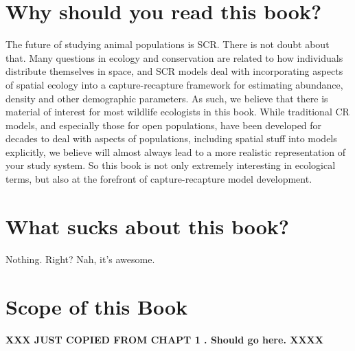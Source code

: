 \section*{Why should you read this book?}

The future of studying animal populations is SCR. There is not doubt
about that. Many questions in ecology and conservation are related to how individuals distribute themselves in space, and SCR models deal with incorporating aspects of spatial ecology into a capture-recapture framework for estimating abundance, density and other demographic parameters. As such, we believe that there is material of interest for most wildlife ecologists in this book. While traditional CR models, and especially those for open populations, have been developed for decades to deal with aspects of populations, including spatial stuff into models explicitly, we believe will almost always lead to a more realistic representation of your study system.  So this book is not only extremely interesting in ecological terms, but also at the forefront of capture-recapture model development.

\section{What sucks about this book?}

Nothing. Right?
Nah, it's awesome. 



\section{Scope of this Book}

{\bf XXX JUST COPIED FROM CHAPT 1 . Should go here. XXXX}


